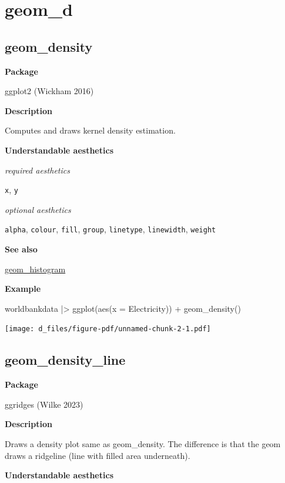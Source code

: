 \documentclass[
  letterpaper,
  DIV=11,
  numbers=noendperiod]{scrreprt}
\newenvironment{Shaded}{\begin{snugshade}}{\end{snugshade}}
\newcommand{\AttributeTok}[1]{\textcolor[rgb]{0.40,0.45,0.13}{#1}}
\newcommand{\FunctionTok}[1]{\textcolor[rgb]{0.28,0.35,0.67}{#1}}
\newcommand{\NormalTok}[1]{\textcolor[rgb]{0.00,0.23,0.31}{#1}}
\newcommand{\SpecialCharTok}[1]{\textcolor[rgb]{0.37,0.37,0.37}{#1}}
\begin{document}
\chapter{geom\_d}\label{sec-d}

\section{geom\_density}\label{density}

\textbf{Package}

ggplot2 (Wickham 2016)

\textbf{Description}

Computes and draws kernel density estimation.

\textbf{Understandable aesthetics}

\emph{required aesthetics}

\texttt{x}, \texttt{y}

\emph{optional aesthetics}

\texttt{alpha}, \texttt{colour}, \texttt{fill}, \texttt{group},
\texttt{linetype}, \texttt{linewidth}, \texttt{weight}

\textbf{See also}

\hyperref[hist]{geom\_histogram}

\textbf{Example}

\begin{Shaded}
\begin{Highlighting}[]
\NormalTok{worldbankdata }\SpecialCharTok{|\textgreater{}}
  \FunctionTok{ggplot}\NormalTok{(}\FunctionTok{aes}\NormalTok{(}\AttributeTok{x =}\NormalTok{ Electricity)) }\SpecialCharTok{+}   \FunctionTok{geom\_density}\NormalTok{()}
\end{Highlighting}
\end{Shaded}

\texttt{[image: d\_files/figure-pdf/unnamed-chunk-2-1.pdf]}

\section{geom\_density\_line}\label{density_line}

\textbf{Package}

ggridges (Wilke 2023)

\textbf{Description}

Draws a density plot same as geom\_density. The difference is that the
geom draws a ridgeline (line with filled area underneath).

\textbf{Understandable aesthetics}
\end{document}

